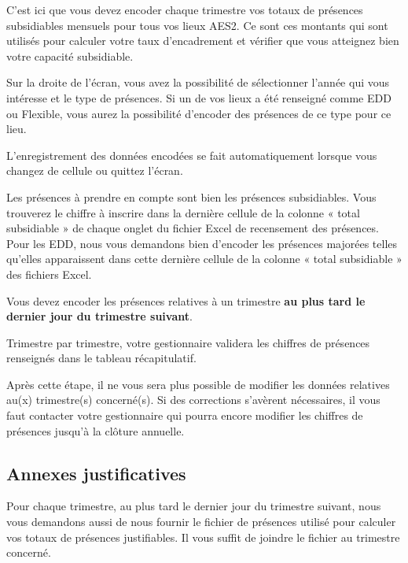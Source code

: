 C’est ici que vous devez encoder chaque trimestre vos totaux de présences subsidiables mensuels pour tous vos lieux AES2. Ce sont ces montants qui sont utilisés pour calculer votre taux d’encadrement et vérifier que vous atteignez bien votre capacité subsidiable.

Sur la droite de l’écran, vous avez la possibilité de sélectionner l’année qui vous intéresse et le type de présences.
Si un de vos lieux a été renseigné comme EDD ou Flexible, vous aurez la possibilité d’encoder des présences de ce type pour ce lieu.
\begin{info}
L’enregistrement des données encodées se fait automatiquement lorsque vous changez de cellule ou quittez l’écran. 
\end{info}


Les présences à prendre en compte sont bien les présences subsidiables. Vous trouverez le chiffre à inscrire dans la dernière cellule de la colonne « total subsidiable » de chaque onglet du fichier Excel de recensement des présences. Pour les EDD, nous vous demandons bien d’encoder les présences majorées telles qu’elles apparaissent dans cette dernière cellule de la colonne « total subsidiable » des fichiers Excel.

\begin{attention}
Vous devez encoder les présences relatives à un trimestre \textbf{au plus tard le dernier jour du trimestre suivant}. 
\end{attention}



Trimestre par trimestre, votre gestionnaire validera les chiffres de présences renseignés dans le tableau récapitulatif. 
\begin{remarque}
Après cette étape, il ne vous sera plus possible de modifier les données relatives au(x) trimestre(s) concerné(s). Si des corrections s’avèrent nécessaires, il vous faut contacter votre gestionnaire qui pourra encore modifier les chiffres de présences jusqu’à la clôture annuelle.  
\end{remarque}


\subsection{Annexes justificatives}
Pour chaque trimestre, au plus tard le dernier jour du trimestre suivant, nous vous demandons aussi de nous fournir le fichier de présences utilisé pour calculer vos totaux de présences justifiables. Il vous suffit de joindre le fichier au trimestre concerné.

